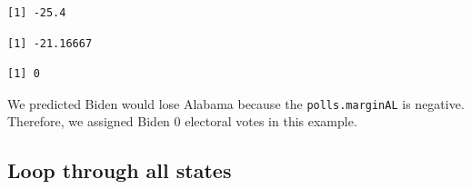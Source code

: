 \documentclass[
  letterpaper,
  DIV=11,
  numbers=noendperiod]{scrreprt}
\newenvironment{Shaded}{\begin{snugshade}}{\end{snugshade}}
\newcommand{\DecValTok}[1]{\textcolor[rgb]{0.68,0.00,0.00}{#1}}
\newcommand{\DocumentationTok}[1]{\textcolor[rgb]{0.37,0.37,0.37}{\textit{#1}}}
\newcommand{\FunctionTok}[1]{\textcolor[rgb]{0.28,0.35,0.67}{#1}}
\newcommand{\NormalTok}[1]{\textcolor[rgb]{0.00,0.23,0.31}{#1}}
\newcommand{\OtherTok}[1]{\textcolor[rgb]{0.00,0.23,0.31}{#1}}
\newcommand{\SpecialCharTok}[1]{\textcolor[rgb]{0.37,0.37,0.37}{#1}}
\begin{document}
\begin{verbatim}
[1] -25.4
\end{verbatim}

\begin{Shaded}
\end{Shaded}

\begin{verbatim}
[1] -21.16667
\end{verbatim}

\begin{Shaded}
\end{Shaded}

\begin{verbatim}
[1] 0
\end{verbatim}

We predicted Biden would lose Alabama because the
\texttt{polls.marginAL} is negative. Therefore, we assigned Biden 0
electoral votes in this example.

\hypertarget{loop-through-all-states}{%
\subsection{Loop through all states}\label{loop-through-all-states}}
\end{document}
